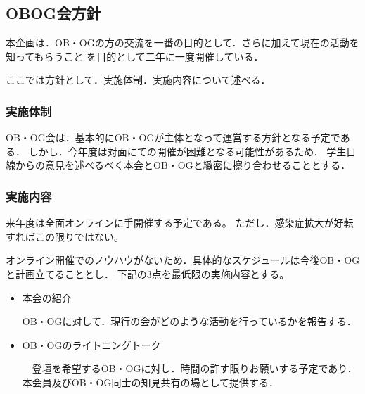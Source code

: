 \subsection*{OBOG会方針}


本企画は．OB・OGの方の交流を一番の目的として．さらに加えて現在の活動を知ってもらうこと
を目的として二年に一度開催している．

ここでは方針として．実施体制．実施内容について述べる．

\subsubsection*{実施体制}

OB・OG会は．基本的にOB・OGが主体となって運営する方針となる予定である．
しかし．今年度は対面にての開催が困難となる可能性があるため．
学生目線からの意見を述べるべく本会とOB・OGと緻密に擦り合わせることとする．

\subsubsection*{実施内容}

来年度は全面オンラインに手開催する予定である。
ただし．感染症拡大が好転すればこの限りではない。

オンライン開催でのノウハウがないため．具体的なスケジュールは今後OB・OGと計画立てることとし．
下記の3点を最低限の実施内容とする。

\begin{itemize}
    \item 本会の紹介

        OB・OGに対して．現行の会がどのような活動を行っているかを報告する．
    \item OB・OGのライトニングトーク

        　登壇を希望するOB・OGに対し．時間の許す限りお願いする予定であり．本会員及びOB・OG同士の知見共有の場として提供する．
\end{itemize}

